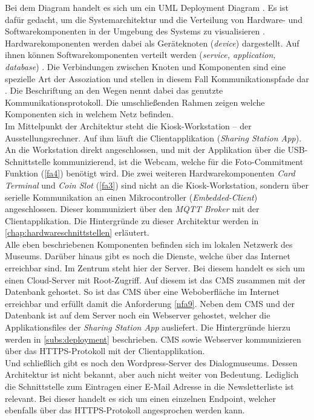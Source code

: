 Bei dem Diagram handelt es sich um ein UML Deployment Diagram \cite{uml-spec}. Es ist dafür 
gedacht, um die Systemarchitektur und die Verteilung von Hardware- und Softwarekomponenten in der 
Umgebung des Systems zu visualisieren \cite{uml-2.5}. Hardwarekomponenten werden dabei als Geräteknoten
(\emph{device}) dargestellt. Auf ihnen können Softwarekomponenten verteilt werden (\emph{service,
application, database}) \cite{uml-diagrams, uml-2.5}. Die Verbindungen zwischen Knoten und Komponenten
sind eine spezielle Art der Assoziation und stellen in diesem Fall Kommunikationspfade dar \cite{uml-2.5}.
Die Beschriftung an den Wegen nennt dabei das genutzte Kommunikationsprotokoll.
Die umschließenden Rahmen zeigen welche Komponenten sich in welchem Netz befinden.\\
Im Mittelpunkt der Architektur steht die Kiosk-Workstation -- der Ausstellungsrechner. Auf ihm läuft
die Clientapplikation (\emph{Sharing Station App}). An die Workstation direkt angeschlossen, und mit der
Applikation über die USB-Schnittstelle kommunizierend, ist die Webcam, 
welche für die Foto-Commitment Funktion (\ref{fa4}) benötigt wird. 
Die zwei weiteren Hardwarekomponenten \emph{Card Terminal} und \emph{Coin Slot} (\ref{fa3}) sind nicht 
an die Kiosk-Workstation, sondern über serielle Kommunikation an einen
Mikrocontroller (\emph{Embedded-Client}) angeschlossen. Dieser kommuniziert über
den \emph{MQTT Broker} mit der Clientapplikation. Die Hintergründe zu dieser Architektur werden in
\autoref{chap:hardwareschnittstellen} erläutert.\\
Alle eben beschriebenen Komponenten befinden sich im lokalen Netzwerk des Museums. Darüber hinaus gibt 
es noch die Dienste, welche über das Internet erreichbar sind. Im Zentrum steht hier der Server. 
Bei diesem handelt es sich um einen Cloud-Server mit Root-Zugriff. Auf diesem ist das CMS zusammen mit
der Datenbank gehostet. So ist das CMS über eine Weboberfläche im Internet erreichbar und erfüllt
damit die Anforderung \ref{nfa9}. Neben dem CMS und der Datenbank ist auf dem Server noch ein
Webserver gehostet, welcher die Applikationsfiles der \emph{Sharing
Station App} ausliefert. Die Hintergründe hierzu werden in \autoref{subs:deployment} beschrieben.
CMS sowie Webserver kommunizieren über das HTTPS-Protokoll mit der Clientapplikation.\\
Und schließlich gibt es noch den Wordpress-Server des Dialogmuseums. Dessen Architektur ist nicht bekannt,
aber auch nicht weiter von Bedeutung. Lediglich die Schnittstelle zum Eintragen einer E-Mail Adresse in 
die Newsletterliste ist relevant. Bei dieser handelt es sich um einen einzelnen Endpoint, welcher ebenfalls
über das HTTPS-Protokoll angesprochen werden kann. 